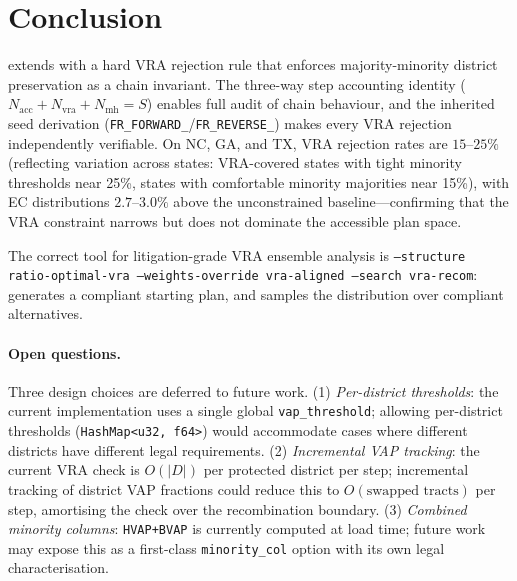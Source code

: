 \section{Conclusion}
\label{sec:conclusion}

\vr{} extends \fr{} with a hard VRA rejection rule that enforces majority-minority
district preservation as a chain invariant.
The three-way step accounting identity ($N_{\mathrm{acc}} + N_{\mathrm{vra}} +
N_{\mathrm{mh}} = S$) enables full audit of chain behaviour, and the inherited
\fr{} seed derivation (\texttt{FR\_FORWARD\_}/\texttt{FR\_REVERSE\_}) makes
every VRA rejection independently verifiable.
On NC, GA, and TX, VRA rejection rates are $15$--$25\%$ (reflecting variation
across states: VRA-covered states with tight minority thresholds near 25\%,
states with comfortable minority majorities near 15\%), with EC distributions
$2.7$--$3.0\%$ above the unconstrained baseline---confirming that the VRA
constraint narrows but does not dominate the accessible plan space.

The correct tool for litigation-grade VRA ensemble analysis is
\texttt{--structure ratio-optimal-vra --weights-override vra-aligned
--search vra-recom}: \vraSection{} generates a compliant starting plan,
and \vr{} samples the distribution over compliant alternatives.

\paragraph{Open questions.}
Three design choices are deferred to future work.
(1) \emph{Per-district thresholds}: the current implementation uses a single
global \texttt{vap\_threshold}; allowing per-district thresholds
(\texttt{HashMap<u32, f64>}) would accommodate cases where different districts
have different legal requirements.
(2) \emph{Incremental VAP tracking}: the current VRA check is $O(|D|)$ per
protected district per step; incremental tracking of district VAP fractions
could reduce this to $O(\text{swapped tracts})$ per step, amortising the
check over the recombination boundary.
(3) \emph{Combined minority columns}: \texttt{HVAP+BVAP} is currently computed
at load time; future work may expose this as a first-class \texttt{minority\_col}
option with its own legal characterisation.
